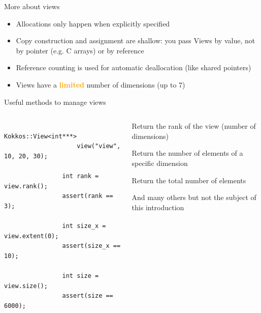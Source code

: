 \documentclass[aspectratio=169]{beamer}
\newcommand{\highlight}[1]{\textcolor{orange}{\textbf{#1}}}
\begin{document}

\begin{frame}{More about views}
    \begin{itemize}
        \item Allocations only happen when explicitly specified
        \item Copy construction and assignment are shallow: you pass Views by value, not by pointer (e.g. C arrays) or by reference
        \item Reference counting is used for automatic deallocation (like shared pointers)
        \item Views have a \highlight{limited} number of dimensions (up to 7)
    \end{itemize}
\end{frame}


\begin{frame}[fragile]{Useful methods to manage views}
    \begin{columns}
        \begin{column}{0.5\linewidth}
            \begin{verbatim}
                Kokkos::View<int***>
                    view("view", 10, 20, 30);

                int rank = view.rank();
                assert(rank == 3);

                int size_x = view.extent(0);
                assert(size_x == 10);

                int size = view.size();
                assert(size == 6000);
            \end{verbatim}
        \end{column}
        \begin{column}{0.5\linewidth}
            \begin{description}
                \item[\texttt{rank()}] Return the rank of the view (number of dimensions)
                \item[\texttt{extent(dim)}] Return the number of elements of a specific dimension
                \item[\texttt{size()}] Return the total number of elements
            \end{description}

            And many others but not the subject of this introduction
        \end{column}
    \end{columns}
\end{frame}
\end{document}
